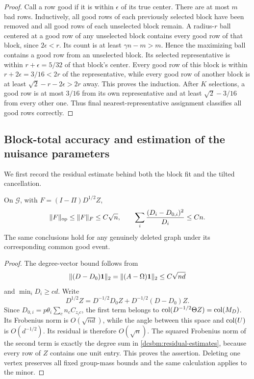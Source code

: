 \begin{proof}
Call a row good if it is within \(\epsilon\) of its true center.
There are at most \(m\) bad rows.  Inductively, all good rows of each
previously selected block have been removed and all good rows of each
unselected block remain.  A radius-\(r\) ball centered at a good row
of any unselected block contains every good row of that block, since
\(2\epsilon<r\).  Its count is at least \(\gamma n-m>m\).
Hence the maximizing ball contains a good row from an unselected block.
Its selected representative is within \(r+\epsilon=5/32\) of that
block's center.  Every good row of this block is within
\(r+2\epsilon=3/16<2r\) of the representative, while every good row
of another block is at least
\(\sqrt2-r-2\epsilon>2r\) away.  This proves the induction.
After \(K\) selections, a good row is at most \(3/16\) from its own
representative and at least \(\sqrt2-3/16\) from every other one.
Thus final nearest-representative assignment classifies all good
rows correctly.
\end{proof}

\subsection{Block-total accuracy and estimation of the nuisance parameters}

We first record the residual estimate behind both the block fit and the
tilted cancellation.

\begin{lemma}
\label{dcsbm:block-residual}
On \(\mathcal G\), with \(F=(I-\Pi)D^{1/2}Z\),
\begin{equation}
 \|F\|_{\mathrm{op}}\le\|F\|_F\le C\sqrt n,\qquad
 \sum_i\frac{(D_i-D_{0,i})^2}{D_i}\le Cn.
 \label{dcsbm:residual-estimates}
\end{equation}
The same conclusions hold for any genuinely deleted graph under its
corresponding common good event.
\end{lemma}

\begin{proof}
The degree-vector bound follows from
\[
 \|(D-D_0)\mathbf 1\|_2
 =\|(A-\Omega)\mathbf 1\|_2\le C\sqrt{nd}
\]
and \(\min_iD_i\ge cd\).
Write
\[
 D^{1/2}Z
 =D^{-1/2}D_0Z+D^{-1/2}(D-D_0)Z.
\]
Since \(D_{0,i}=p\theta_i\sum_c n_cC_{z_i c}\), the first term
belongs to \(\operatorname{col}(D^{-1/2}\Theta Z)=\operatorname{col}(M_D)\).
Its Frobenius norm is \(O(\sqrt{nd})\), while the angle between this
space and \(\operatorname{col}(U)\) is \(O(d^{-1/2})\).  Its residual is therefore
\(O(\sqrt n)\).  The squared Frobenius norm of the second term is
exactly the degree sum in \cref{dcsbm:residual-estimates}, because
every row of \(Z\) contains one unit entry.  This proves the assertion.
Deleting one vertex preserves all fixed group-mass bounds and the same
calculation applies to the minor.
\end{proof}

